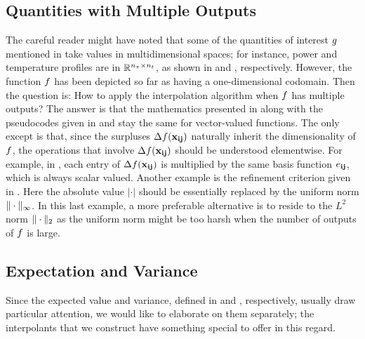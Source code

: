 \subsection{Quantities with Multiple Outputs}
The careful reader might have noted that some of the quantities of interest $g$
mentioned in  take values in multidimensional spaces; for
instance, power and temperature profiles are in $\mathbb{R}^{{n_\pi} \times {n_t}}$, as
shown in  and , respectively.
However, the function $f$ has been depicted so far as having a one-dimensional
codomain. Then the question is: How to apply the interpolation algorithm when
$f$ has multiple outputs? The answer is that the mathematics presented in
 along with the pseudocodes given in  and
 stay the same for vector-valued functions. The only except is
that, since the surpluses $\Delta f(\mathbf{x}_{\mathbf{i}\mathbf{j}})$ naturally inherit the
dimensionality of $f$, the operations that involve $\Delta f(\mathbf{x}_{\mathbf{i}\mathbf{j}})$
should be understood elementwise. For example, in ,
each entry of $\Delta f(\mathbf{x}_{\mathbf{i}\mathbf{j}})$ is multiplied by the same basis function
$e_{\mathbf{i}\mathbf{j}}$, which is always scalar valued. Another example is the refinement
criterion given in . Here the absolute value $|\cdot|$ should be
essentially replaced by the uniform norm $\| \cdot \|_\infty$. In this last
example, a more preferable alternative is to reside to the $L^2$ norm
$\| \cdot \|_2$ as the uniform norm might be too harsh when the number of
outputs of $f$ is large.

\subsection{Expectation and Variance} 
Since the expected value and variance, defined in  and
, respectively, usually draw particular attention, we would like
to elaborate on them separately; the interpolants that we construct have
something special to offer in this regard.

